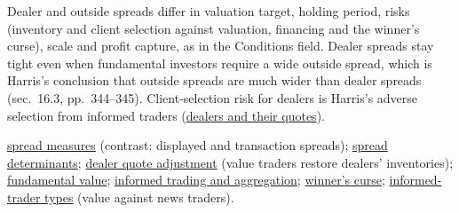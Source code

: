 \begin{qfdefinition}
Dealer and outside spreads differ in valuation target, holding period, risks (inventory and client selection against valuation, financing and the winner's curse), scale and profit capture, as in the Conditions field. Dealer spreads stay tight even when fundamental investors require a wide outside spread, which is Harris's conclusion that outside spreads are much wider than dealer spreads (sec.~16.3, pp.~344--345). Client-selection risk for dealers is Harris's adverse selection from informed traders (\hyperref[def:dealer-quotes-order-flow]{dealers and their quotes}).

 \hyperref[def:spread-measures]{spread measures} (contrast: displayed and transaction spreads); \hyperref[res:spread-determinants]{spread determinants}; \hyperref[meth:dealer-quote-adjustment]{dealer quote adjustment} (value traders restore dealers' inventories); \hyperref[def:fundamental-value]{fundamental value}; \hyperref[res:informed-trading-aggregation]{informed trading and aggregation}; \hyperref[def:winners-curse]{winner's curse}; \hyperref[def:informed-trader-types]{informed-trader types} (value against news traders).

\end{qfdefinition}
